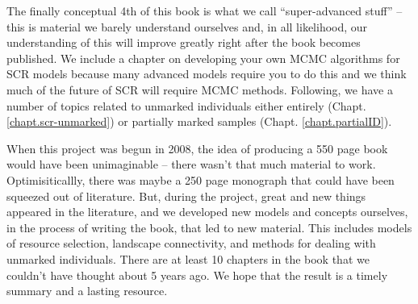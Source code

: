 The finally conceptual 4th of this book is what we call
``super-advanced stuff'' -- this is material we barely understand
ourselves and, in all likelihood, our understanding of this will
improve greatly right after the book becomes published.  We include a
chapter on developing your own MCMC algorithms for SCR models because
many advanced models require you to do this and we think much of the
future of SCR will require MCMC methods. Following, we have a number
of topics related to unmarked individuals either entirely
(Chapt. \ref{chapt.scr-unmarked}) or partially marked samples
(Chapt. \ref{chapt.partialID}).

When this project was begun in 2008, the idea of producing a 550 page
book would have been unimaginable -- there wasn't that much material
to work.  Optimisiticallly, there was maybe a 250 page monograph that
could have been squeezed out of literature.  But, during the project,
great and new things appeared in the literature, and we developed new
models and concepts ourselves, in the process of writing the book,
that led to new material. This includes models of resource selection,
landscape connectivity, and methods for dealing with unmarked
individuals. There are at least 10 chapters in the book that we
couldn't have thought about 5 years ago. We hope that the result is a
timely summary and a lasting resource.



